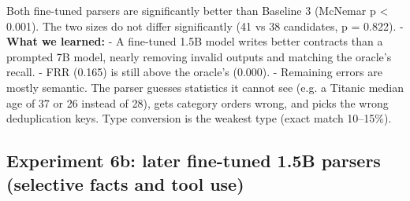 \documentclass[11pt]{article}
\begin{document}
Both fine-tuned parsers are significantly better than Baseline 3
(McNemar p \textless{} 0.001). The two sizes do not differ significantly
(41 vs 38 candidates, p = 0.822). - \textbf{What we learned:} - A
fine-tuned 1.5B model writes better contracts than a prompted 7B model,
nearly removing invalid outputs and matching the oracle's recall. - FRR
(0.165) is still above the oracle's (0.000). - Remaining errors are
mostly semantic. The parser guesses statistics it cannot see (e.g. a
Titanic median age of 37 or 26 instead of 28), gets category orders
wrong, and picks the wrong deduplication keys. Type conversion is the
weakest type (exact match 10--15\%).

\subsection{Experiment 6b: later fine-tuned 1.5B parsers (selective
facts and tool use)}
\end{document}
